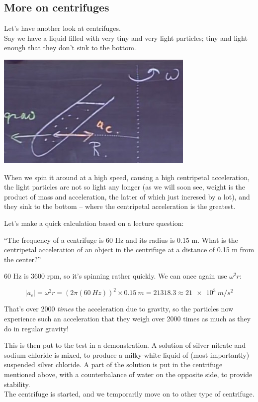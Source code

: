 \documentclass[12pt,a4paper]{report}
\begin{document}
\subsection{More on centrifuges}

Let's have another look at centrifuges.\\
Say we have a liquid filled with very tiny and very light particles; tiny and light enough that they don't sink to the bottom.

\begin{center}
\includegraphics[scale=0.6]{Graphics/lec5_centrifuge}
\end{center}

When we spin it around at a high speed, causing a high centripetal acceleration, the light particles are not so light any longer (as we will soon see, weight is the product of mass and acceleration, the latter of which just incresed by a lot), and they sink to the bottom -- where the centripetal acceleration is the greatest.

Let's make a quick calculation based on a lecture question:

``The frequency of a centrifuge is 60 Hz and its radius is 0.15 m. What is the centripetal acceleration of an object in the centrifuge at a distance of 0.15 m from the center?''

60 Hz is 3600 rpm, so it's spinning rather quickly. We can once again use $\omega^2 r$:

\begin{equation}
|a_c| = \omega^2 r = (2 \pi (\SI{60}{Hz}))^2 \times \SI{0.15}{m} = 21318.3 \approx \SI{21e3}{m/s^2}
\end{equation}

That's over 2000 \emph{times} the acceleration due to gravity, so the particles now experience such an acceleration that they weigh over 2000 times as much as they do in regular gravity!

This is then put to the test in a demonstration. A solution of silver nitrate and sodium chloride is mixed, to produce a milky-white liquid of (most importantly) suspended silver chloride. A part of the solution is put in the centrifuge mentioned above, with a counterbalance of water on the opposite side, to provide stability.\\
The centrifuge is started, and we temporarily move on to other type of centrifuge.
\end{document}
